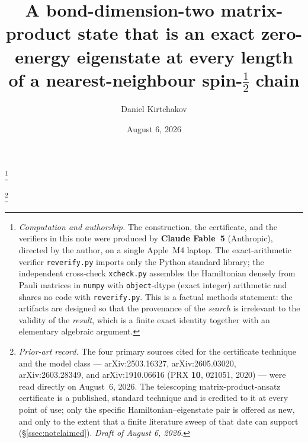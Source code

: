 \documentclass[11pt]{amsart}
\theoremstyle{plain}
\theoremstyle{definition}
\theoremstyle{remark}
\begin{document}
\title[An exact all-length matrix-product eigenstate of a spin-$\tfrac12$
chain]{A bond-dimension-two matrix-product state that is an exact
zero-energy eigenstate at every length of a nearest-neighbour spin-$\tfrac12$
chain}

\author{Daniel Kirtchakov}
\address{Independent researcher (\texttt{05oz}); no institutional
affiliation.}

\thanks{\emph{Computation and authorship.} The construction, the
certificate, and the verifiers in this note were produced by
\textbf{Claude Fable~5} (Anthropic), directed by the author, on a single
Apple~M4 laptop. The exact-arithmetic verifier \texttt{reverify.py} imports
only the Python standard library; the independent cross-check
\texttt{xcheck.py} assembles the Hamiltonian densely from Pauli matrices in
\texttt{numpy} with \texttt{object}-dtype (exact integer) arithmetic and
shares no code with \texttt{reverify.py}. This is a factual methods
statement: the artifacts are designed so that the provenance of the
\emph{search} is irrelevant to the validity of the \emph{result}, which is
a finite exact identity together with an elementary algebraic argument.}

\thanks{\emph{Prior-art record.} The four primary sources cited for the
certificate technique and the model class --- arXiv:2503.16327,
arXiv:2605.03020, arXiv:2603.28349, and arXiv:1910.06616 (PRX
\textbf{10}, 021051, 2020) --- were read directly on August~6, 2026. The
telescoping matrix-product-ansatz certificate is a published, standard
technique and is credited to it at every point of use; only the specific
Hamiltonian--eigenstate pair is offered as new, and only to the extent that
a finite literature sweep of that date can support (\S\ref{ssec:notclaimed}).
\emph{Draft of August 6, 2026.}}


\date{August 6, 2026}
\end{document}
